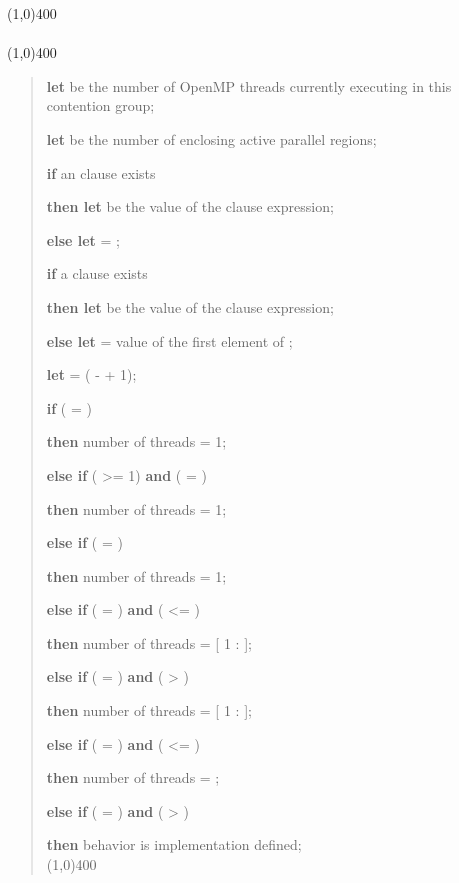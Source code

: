 \begin{samepage}
\nolinenumbers\line(1,0){400}\\[.4\baselineskip]
\\[-0.5\baselineskip]
\line(1,0){400}\linenumbers

\begin{quote}
\textbf{let}  be the number of OpenMP threads currently executing in 
this contention group;

\textbf{let}  be the number of enclosing active parallel regions;

\textbf{if} an  clause exists

\textbf{then let}  be the value of the  clause expression; 

\textbf{else let}  = ; 

\textbf{if} a  clause exists 

\textbf{then let}  be the value of the  clause 
expression; 

\textbf{else let}  = value of the first element of ; 

\textbf{let}  = ( -  + 1);

\textbf{if} ( = ) 

\textbf{then} number of threads = 1; 

\textbf{else if} ( >= 1) \textbf{and} ( = ) 

\textbf{then} number of threads = 1; 

\textbf{else if} ( = ) 

\textbf{then} number of threads = 1; 

\textbf{else if} ( = ) \textbf{and} ( <= )

\textbf{then} number of threads = [ 1 :  ];

\textbf{else if} ( = ) \textbf{and} ( > )

\textbf{then} number of threads = [ 1 :  ];

\textbf{else if} ( = ) \textbf{and} ( <= )

\textbf{then} number of threads = ;

\textbf{else if} ( = ) \textbf{and} ( > )

\textbf{then} behavior is implementation defined;\\[-2ex]

\nolinenumbers\line(1,0){400}\linenumbers
\end{quote}
\end{samepage}
\bigskip

